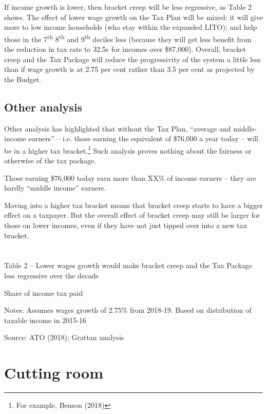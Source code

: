 \documentclass[submission]{grattan}\usepackage[]{graphicx}\usepackage[]{color}
\begin{document}
If income growth is lower, then bracket creep will be less regressive, as Table 2 shows. The effect of lower wage growth on the Tax Plan will be mixed: it will give more to low income households (who stay within the expanded LITO); and help those in the 7\textsuperscript{th} 8\textsuperscript{th} and 9\textsuperscript{th} deciles less (because they will get less benefit from the reduction in tax rate to 32.5c for incomes over \$87,000). Overall, bracket creep and the Tax Package will reduce the progressivity of the system a little less than if wage growth is at 2.75 per cent rather than 3.5 per cent as projected by the Budget.

\section{Other analysis}\label{sec:other-analysis}

Other analysis has highlighted that without the Tax Plan, ``average and middle-income earners'' -- i.e. those earning the equivalent of \$76,000 a year today -- will be in a higher tax bracket.\footnote{For example, Benson (2018)} Such analysis proves nothing about the fairness or otherwise of the tax package.

Those earning \$76,000 today earn more than XX\% of income earners -- they are hardly ``middle income'' earners.

Moving into a higher tax bracket means that bracket creep starts to have a bigger effect on a taxpayer. But the overall effect of bracket creep may still be larger for those on lower incomes, even if they have not just tipped over into a new tax bracket.

\chapter{}\label{chap:section-2}

Table 2 -- Lower wages growth would make bracket creep and the Tax Package less regressive over the decade

Share of income tax paid



Notes: Assumes wages growth of 2.75\% from 2018-19. Based on distribution of taxable income in 2015-16

Source: ATO (2018); Grattan analysis

\chapter{Cutting room}\label{chap:cutting-room}
\end{document}
